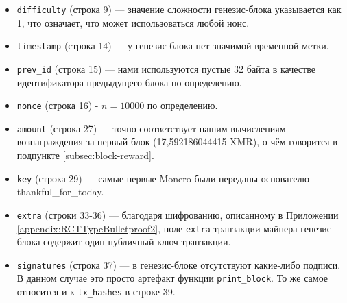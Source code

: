\begin{appendices}
\begin{itemize}
	\item {\tt difficulty} (строка 9) — значение сложности генезис-блока указывается как 1, что означает, что может использоваться любой нонс.
	\item {\tt timestamp} (строка 14) — у генезис-блока нет значимой временной метки.
	\item {\tt prev\_id} (строка 15) — нами используются пустые 32 байта в качестве идентификатора предыдущего блока по определению.
	\item {\tt nonce} (строка 16) - $n = 10000$ по определению.
	\item {\tt amount} (строка 27) — точно соответствует нашим вычислениям вознаграждения за пер\-вый блок (17,592186044415 XMR), о чём говорится в подпункте \ref{subsec:block-reward}.
	\item {\tt key} (строка 29) — самые первые Monero были переданы основателю thankful\_for\_today.
	\item {\tt extra} (строки 33-36) — благодаря шифрованию, описанному в Приложении \ref{appendix:RCTTypeBulletproof2}, поле {\tt extra} транзакции майнера генезис-блока содержит один публичный ключ транзакции.
	\item {\tt signatures} (строка 37) — в генезис-блоке отсутствуют какие-либо подписи. В данном случае это просто артефакт функции {\tt print\_block}. То же самое относится и к {\tt tx\_hashes} в строке 39.
\end{itemize}


\end{appendices}